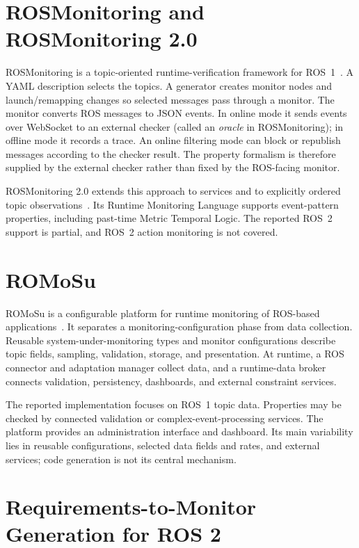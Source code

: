 \section{ROSMonitoring and ROSMonitoring 2.0}

ROSMonitoring is a topic-oriented runtime-verification framework for
ROS~1~\cite{ferrando2020rosmonitoring}. A YAML description selects the topics.
A generator creates monitor nodes and launch/remapping changes so selected
messages pass through a monitor. The monitor converts ROS messages to JSON
events. In online mode it sends events over WebSocket to an external checker
(called an \emph{oracle} in ROSMonitoring); in offline mode it records a
trace. An online filtering mode can block or republish messages according to
the checker result. The property formalism is therefore supplied by the
external checker rather than fixed by the ROS-facing monitor.

ROSMonitoring 2.0 extends this approach to services and to explicitly ordered
topic observations~\cite{saadat2024rosmonitoring2}. Its Runtime Monitoring
Language supports event-pattern properties, including past-time Metric Temporal
Logic. The reported ROS~2 support is partial, and ROS~2 action monitoring is
not covered.

\section{ROMoSu}

ROMoSu is a configurable platform for runtime monitoring of ROS-based
applications~\cite{stadler2022towards,stadler2023romosu}. It separates a
monitoring-configuration phase from data collection. Reusable
system-under-monitoring types and monitor configurations describe topic
fields, sampling,
validation, storage, and presentation. At runtime, a ROS connector and
adaptation manager collect data, and a runtime-data broker connects validation,
persistency, dashboards, and external constraint services.

The reported implementation focuses on ROS~1 topic data. Properties may be
checked by connected validation or complex-event-processing services. The
platform provides an administration interface and dashboard. Its main
variability lies in reusable configurations, selected data fields and rates,
and external services; code generation is not its central mechanism.

\section{Requirements-to-Monitor Generation for ROS 2}

